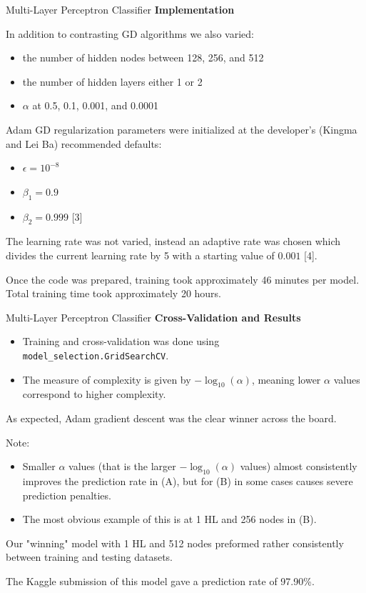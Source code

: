 \documentclass[titlepage,leqno]{beamer}%
\begin{document}
\begin{frame}{Multi-Layer Perceptron Classifier}
\scriptsize
\textbf{Implementation}

In addition to contrasting GD algorithms we also varied:
\begin{itemize}
	\item the number of hidden nodes between 128, 256, and 512
	\item the number of hidden layers either 1 or 2
	\item $\alpha$ at 0.5, 0.1, 0.001, and 0.0001
\end{itemize}
\medskip
Adam GD regularization parameters were initialized at the developer's (Kingma and Lei Ba) recommended defaults:
\begin{itemize}
	\item $\epsilon = 10^{-8}$ 
	\item $\beta_1=0.9$ 
	\item $\beta_2=0.999$ [3]
\end{itemize}
\medskip
The learning rate was not varied, instead an adaptive rate was chosen which divides the current learning rate by 5 with a starting value of $0.001$ [4]. 

\medskip

Once the code was prepared, training took approximately 46 minutes per model. Total training time took approximately 20 hours.

\end{frame}
\begin{frame}[fragile]{Multi-Layer Perceptron Classifier}
\scriptsize
\textbf{Cross-Validation and Results}
\begin{itemize}
	\item Training and cross-validation was done using \verb+model_selection.GridSearchCV+.
	\item The measure of complexity is given by $-\log_{10}(\alpha)$, meaning lower $\alpha$ values 
	correspond to higher complexity.
\end{itemize}
\medskip
As expected, Adam gradient descent was the clear winner across the board. 

Note:
\begin{itemize}
	\item Smaller $\alpha$ values (that is the larger $-\log_{10}(\alpha)$ values) almost consistently 
	improves the prediction rate in (A), but for (B) in some cases causes severe prediction penalties.
	\item The most obvious example of this is at 1 HL and 256 nodes in (B). 
\end{itemize} 
\medskip

Our "winning" model with 1 HL and 512 nodes preformed rather consistently between training and testing datasets.

\medskip

The Kaggle submission of this model gave a prediction rate of 97.90\%.

\end{frame}
\end{document}
